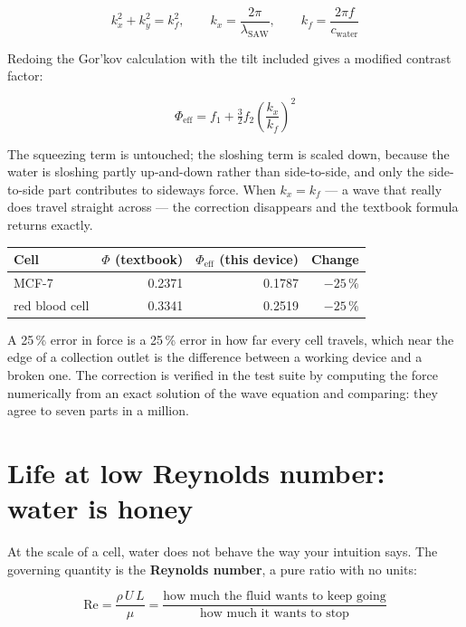 \documentclass[11pt,a4paper]{article}
\begin{document}
\begin{equation}
k_x^2 + k_y^2 = k_f^2,
\qquad k_x = \frac{2\pi}{\lambda_{\text{SAW}}},
\qquad k_f = \frac{2\pi f}{c_{\text{water}}}
\end{equation}

Redoing the Gor'kov calculation with the tilt included gives a modified contrast
factor:

\begin{equation}
\boxed{\;\Phi_{\text{eff}} = f_1 + \tfrac{3}{2}f_2\left(\frac{k_x}{k_f}\right)^{\!2}\;}
\label{eq:phieff}
\end{equation}

The squeezing term is untouched; the sloshing term is scaled down, because the
water is sloshing partly up-and-down rather than side-to-side, and only the
side-to-side part contributes to sideways force. When $k_x = k_f$ --- a wave
that really does travel straight across --- the correction disappears and the
textbook formula returns exactly.

\begin{center}\small
\begin{tabular}{lrrr}
\toprule
\textbf{Cell} & $\Phi$ \textbf{(textbook)} & $\Phi_{\text{eff}}$ \textbf{(this device)} & \textbf{Change} \\
\midrule
MCF-7 & 0.2371 & 0.1787 & $-25\,\%$ \\
red blood cell & 0.3341 & 0.2519 & $-25\,\%$ \\
\bottomrule
\end{tabular}
\end{center}

A 25\,\% error in force is a 25\,\% error in how far every cell travels, which
near the edge of a collection outlet is the difference between a working device
and a broken one. The correction is verified in the test suite by computing the
force numerically from an exact solution of the wave equation and comparing:
they agree to seven parts in a million.

\section{Life at low Reynolds number: water is honey}
\label{sec:lowre}

At the scale of a cell, water does not behave the way your intuition says.
The governing quantity is the \textbf{Reynolds number}, a pure ratio with no
units:

\begin{equation}
\mathrm{Re} = \frac{\rho\, U\, L}{\mu}
= \frac{\text{how much the fluid wants to keep going}}{\text{how much it wants to stop}}
\end{equation}
\end{document}
